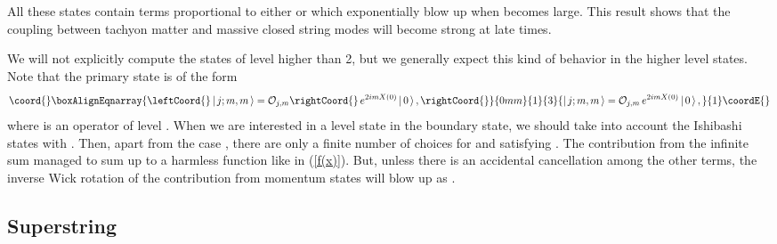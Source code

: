 \documentclass[a4paper,12pt]{article} \textheight=8.5truein
\providecommand{\ket}[1]{\left|\, #1\,\right\rangle}
\begin{document}
All these states contain terms proportional to either \coordHE{}
or \coordHE{} which exponentially blow up when \coordHE{} becomes
large. This result shows that the coupling between tachyon matter
and massive closed string modes will become strong at late times.

We will not explicitly compute the states of level higher than 2,
but we generally expect this kind of behavior
in the higher level states.
Note that the primary state \myHighlight{$\ket{j;m,m}$}\coordHE{} is of the form
\begin{eqnarray}\coord{}\boxAlignEqnarray{\leftCoord{}
\ket{j;m,m}={\cal O}_{j,m}\rightCoord{}\,e^{2imX(0)}\ket{0},
\rightCoord{}}{0mm}{1}{3}{
\ket{j;m,m}={\cal O}_{j,m}\,e^{2imX(0)}\ket{0},
}{1}\coordE{}\end{eqnarray}
where \coordHE{} is an operator of level
\coordHE{}. When we are interested in a level \coordHE{}
state in the boundary state, we should take into account the
Ishibashi states \myHighlight{$\ket{j;m,m}\rangle$}\coordHE{} with \coordHE{}. Then,
apart from the case \coordHE{}, there are only a finite number of
choices for \coordHE{} and \coordHE{} satisfying \coordHE{}. The
contribution from the infinite sum \myHighlight{$\sum_j D_{\pm j,\mp
j}^j\ket{j;\pm j,\pm j}\rangle$}\coordHE{} managed to sum up to a harmless
function like \coordHE{} in (\ref{f(x)}). But, unless there is an
accidental cancellation among the other terms, the inverse Wick
rotation of the contribution from momentum \coordHE{} states will blow
up as \coordHE{}.





\subsection{Superstring}\label{superstring boundary}
\end{document}
